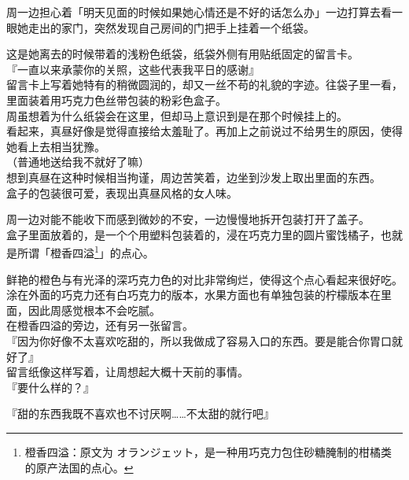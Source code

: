 周一边担心着「明天见面的时候如果她心情还是不好的话怎么办」一边打算去看一眼她走出的家门，突然发现自己房间的门把手上挂着一个纸袋。

这是她离去的时候带着的浅粉色纸袋，纸袋外侧有用贴纸固定的留言卡。\\

『一直以来承蒙你的关照，这些代表我平日的感谢』\\

留言卡上写着她特有的稍微圆润的，却又一丝不苟的礼貌的字迹。往袋子里一看，里面装着用巧克力色丝带包装的粉彩色盒子。\\

周虽想着为什么纸袋会在这里，但却马上意识到是在那个时候挂上的。\\

看起来，真昼好像是觉得直接给太羞耻了。再加上之前说过不给男生的原因，使得她看上去相当犹豫。\\

（普通地送给我不就好了嘛）\\

想到真昼在这种时候相当拘谨，周边苦笑着，边坐到沙发上取出里面的东西。\\

盒子的包装很可爱，表现出真昼风格的女人味。

周一边对能不能收下而感到微妙的不安，一边慢慢地拆开包装打开了盖子。\\

盒子里面放着的，是一个个用塑料包装着的，浸在巧克力里的圆片蜜饯橘子，也就是所谓「橙香四溢\footnote{橙香四溢：原文为 {\jpfont オランジェット}，是一种用巧克力包住砂糖腌制的柑橘类的原产法国的点心。}」的点心。

鲜艳的橙色与有光泽的深巧克力色的对比非常绚烂，使得这个点心看起来很好吃。\\

涂在外面的巧克力还有白巧克力的版本，水果方面也有单独包装的柠檬版本在里面，因此周感觉根本不会吃腻。\\

在橙香四溢的旁边，还有另一张留言。\\

『因为你好像不太喜欢吃甜的，所以我做成了容易入口的东西。要是能合你胃口就好了』\\

留言纸像这样写着，让周想起大概十天前的事情。\\

『要什么样的？』

『甜的东西我既不喜欢也不讨厌啊……不太甜的就行吧』\\

